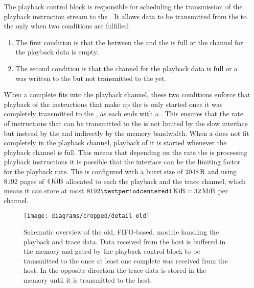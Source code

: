 The playback control block is responsible for scheduling the transmission of the playback instruction stream to the \pbexec{}.
It allows data to be transmitted from the \VFIFO{} to the \pbexec{} only when two conditions are fulfilled:
\begin{enumerate}
\item The first condition is that the \FIFO{} between the \VFIFO{} and the \pbexec{} is full or the \VFIFO{} channel for the playback data is empty.
\item The second condition is that the \VFIFO{} channel for the playback data is full or a \haltInstr{} was written to the \VFIFO{} but not transmitted to the \pbexec{} yet.
\end{enumerate}
When a complete \PlaybackProgram{} fits into the \VFIFO{} playback channel, these two conditions enforce that playback of the instructions that make up the \PlaybackProgram{} is only started once it was completely transmitted to the \VFIFO{}, as each \PlaybackProgram{} ends with a \haltInstr{}. This ensures that the rate of instructions that can be transmitted to the \pbexec{} is not limited by the slow \HostARQ{} interface but instead by the \VFIFO{} and indirectly by the \DDR{} memory bandwidth.
When a \PlaybackProgram{} does not fit completely in the \VFIFO{} playback channel, playback of it is started whenever the \VFIFO{} playback channel is full. This means that depending on the rate the \pbexec{} is processing playback instructions it is possible that the \HostARQ{} interface can be the limiting factor for the playback rate.
The \VFIFO{} is configured with a burst size of \(\SI{2048}{\byte}\) and using $\num{8192}$ pages of $\SI{4}{\kibi\byte}$ allocated to each the playback and the trace channel, which means it can store at most \(\num{8192} · \SI{4}{\kibi\byte} = \SI{32}{\mebi\byte}\) per channel.

\begin{figure}
\centerline{\texttt{[image: diagrams/cropped/detail\_old]}}
\caption{Schematic overview of the old, FIFO{}-based, module handling the playback and trace data. Data received from the host is buffered in the \DDR{} memory and gated by the playback control block to be transmitted to the \pbexec{} once at least one complete \PlaybackProgram{} was received from the host. In the opposite direction the trace data is stored in the \DDR{} memory until it is transmitted to the host.}\label{diagram:detail_old}
\end{figure}

